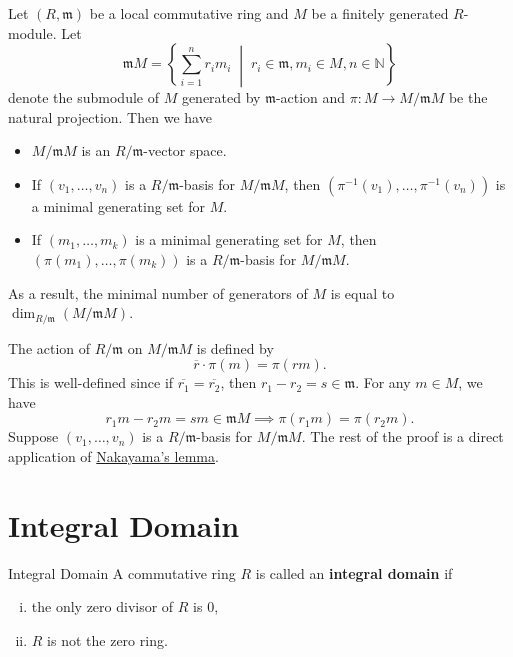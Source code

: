 \begin{proposition}{}{}
    Let $(R, \mathfrak{m})$ be a local commutative ring and $M$ be a finitely generated $R$-module. Let
    \[
\mathfrak{m}M = \left\{ \sum_{i=1}^n r_i m_i \;\middle|\; r_i \in \mathfrak{m}, m_i \in M, n \in \mathbb{N} \right\}
\]
denote the submodule of $M$ generated by $\mathfrak{m}$-action and $\pi: M \to M/\mathfrak{m}M$ be the natural projection. Then we have
\begin{itemize}
    \item $M/\mathfrak{m}M$ is an $R/\mathfrak{m}$-vector space. 
    \item If $(v_1, \ldots, v_n)$ is a $R/\mathfrak{m}$-basis for $M/\mathfrak{m}M$, then $(\pi^{-1}(v_1), \ldots, \pi^{-1}(v_n))$ is a minimal generating set for $M$.
    \item If $(m_1, \ldots, m_k)$ is a minimal generating set for $M$, then $(\pi(m_1), \ldots, \pi(m_k))$ is a $R/\mathfrak{m}$-basis for $M/\mathfrak{m}M$.
\end{itemize}
As a result, the minimal number of generators of $M$ is equal to $\dim_{R/\mathfrak{m}}(M/\mathfrak{m}M)$.
\end{proposition}
\begin{prf}
   The action of $R/\mathfrak{m}$ on $M/\mathfrak{m}M$ is defined by
    \[
        \overline{r}\cdot\pi(m)=\pi(rm).
    \]
   This is well-defined since if $\overline{r_1}=\overline{r_2}$, then $r_1-r_2=s \in \mathfrak{m}$. For any $m\in M$, we have
    \[
         r_1m-r_2m=sm\in \mathfrak{m}M \implies \pi(r_1m)=\pi(r_2m).
    \]
    Suppose $(v_1, \ldots, v_n)$ is a $R/\mathfrak{m}$-basis for $M/\mathfrak{m}M$. The rest of the proof is a direct application of \hyperlink{th:Nakayama_lemma}{Nakayama's lemma}.
\end{prf}


\section{Integral Domain}

\begin{definition}{Integral Domain}{}
    A commutative ring $R$ is called an \textbf{integral domain} if
    \begin{enumerate}[(i)]
        \item the only zero divisor of $R$ is 0,
        \item $R$ is not the zero ring.
    \end{enumerate}
\end{definition}


